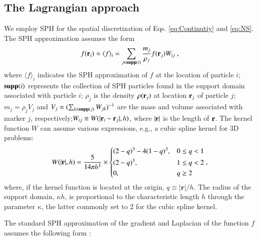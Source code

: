 \documentclass[final,3p,times]{elsarticle}
\begin{document}
\subsection{The Lagrangian approach}\label{sec:Lagrangian}
We employ SPH for the spatial discretization of Eqs. \eqref{eq:Continutiy} and \eqref{eq:NS}. The SPH approximation assumes the form \cite{Monaghan2005a}
\begin{equation}\label{eq:SPH_f}
f(\mathbf r_i) \approx  \langle f\rangle_i= \sum_{j \in \mathbf{supp}(i)} \frac{m_j}{\rho_j}f(\mathbf r_j)W_{ij} \; ,
\end{equation}
where $\langle f \rangle_i$ indicates the SPH approximation of $f$ at the location of particle $i$;  $\mathbf{supp}(i)$ represents the collection of SPH particles found in the support domain associated with particle $i$; $\rho_j$ is the density $\rho({\bf r}_j)$ at location ${\bf r}_j$ of particle $j$; $m_j=\rho_j V_j$ and $V_j=(\sum_{k \in \mathbf{supp}(j)} W_{jk})^{-1}$ are the mass and volume associated with marker $j$, respectively;$W_{ij}\equiv W(|\mathbf{r}_i-\mathbf{r}_j|,h)$, where $|{\bf r}|$ is the length of ${\bf r}$. The kernel function $W$ can assume various expressions, e.g., a cubic spline kernel for 3D problems:
\begin{equation} 
\label{eq:kernelExample}
W(|\mathbf{r}|,h) = \frac{5}{{14\pi {h^3}}} \times \left\{ \begin{aligned}
&{(2 - q)^3} - 4{(1 - q)^3}, && 0 \le q < 1 \\ 
&{(2 - q)^3}, && 1 \le q < 2 \\ 
&0, && q \ge 2 \\ 
\end{aligned} \right.,
\end{equation}
where, if the kernel function is located at the origin, $q\equiv | \mathbf{r} | / h$.  The radius of the support domain, $\kappa h$, is proportional to the characteristic length $h$ through the parameter $\kappa$, the latter commonly set to $2$ for the cubic spline kernel.

The standard SPH approximation of the gradient and Laplacian of the function $f$ assumes the following form \cite{Monaghan2005a}:
\end{document}
